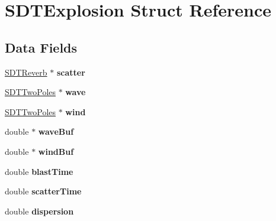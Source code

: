 \hypertarget{struct_s_d_t_explosion}{}\section{S\+D\+T\+Explosion Struct Reference}
\label{struct_s_d_t_explosion}
\subsection*{Data Fields}
\begin{DoxyCompactItemize}
\item 
\hypertarget{struct_s_d_t_explosion_a1afaf966be5de3ed037e495fa858dacb}{}\hyperlink{struct_s_d_t_reverb}{S\+D\+T\+Reverb} $\ast$ {\bfseries scatter}\label{struct_s_d_t_explosion_a1afaf966be5de3ed037e495fa858dacb}

\item 
\hypertarget{struct_s_d_t_explosion_af36850d1f46299e7d44893b375074a23}{}\hyperlink{struct_s_d_t_two_poles}{S\+D\+T\+Two\+Poles} $\ast$ {\bfseries wave}\label{struct_s_d_t_explosion_af36850d1f46299e7d44893b375074a23}

\item 
\hypertarget{struct_s_d_t_explosion_a6871f62b77e6da31d14017422aa0390e}{}\hyperlink{struct_s_d_t_two_poles}{S\+D\+T\+Two\+Poles} $\ast$ {\bfseries wind}\label{struct_s_d_t_explosion_a6871f62b77e6da31d14017422aa0390e}

\item 
\hypertarget{struct_s_d_t_explosion_a978aab224ed739363a618f0b7060a953}{}double $\ast$ {\bfseries wave\+Buf}\label{struct_s_d_t_explosion_a978aab224ed739363a618f0b7060a953}

\item 
\hypertarget{struct_s_d_t_explosion_a6766a86fe363650de7cd0b39d7473e2d}{}double $\ast$ {\bfseries wind\+Buf}\label{struct_s_d_t_explosion_a6766a86fe363650de7cd0b39d7473e2d}

\item 
\hypertarget{struct_s_d_t_explosion_aefd79dfa502522be24fed29577116e7f}{}double {\bfseries blast\+Time}\label{struct_s_d_t_explosion_aefd79dfa502522be24fed29577116e7f}

\item 
\hypertarget{struct_s_d_t_explosion_a66ccb13a3eba7343871e39e81b1eebc8}{}double {\bfseries scatter\+Time}\label{struct_s_d_t_explosion_a66ccb13a3eba7343871e39e81b1eebc8}

\item 
\hypertarget{struct_s_d_t_explosion_a8b4278d3872c62e3920e05de01c47230}{}double {\bfseries dispersion}\label{struct_s_d_t_explosion_a8b4278d3872c62e3920e05de01c47230}


\end{DoxyCompactItemize}
